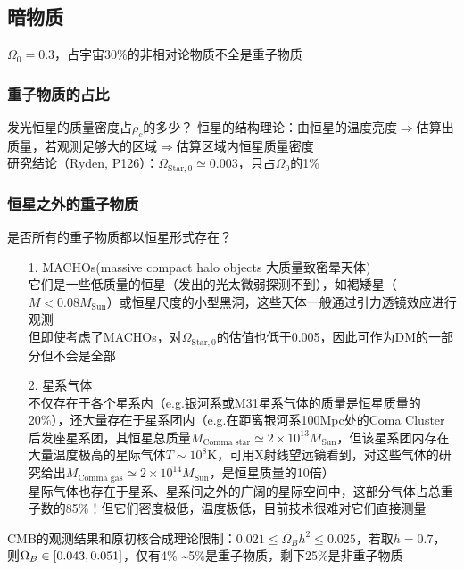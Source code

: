 \subsection{暗物质}
\par 
$\Omega_{0} = 0.3$，占宇宙30\%的非相对论物质不全是重子物质
\subsubsection{重子物质的占比}
\begin{cbox}
	{发光恒星的质量密度占$\rho_c$的多少？}
	恒星的结构理论：由恒星的温度亮度$\Rightarrow$估算出质量，若观测足够大的区域$\Rightarrow$估算区域内恒星质量密度 \\
	研究结论（Ryden, P126）：$\Omega_{\text{Star}, 0} \simeq 0.003$，只占$\Omega_{0}$的1\%
\end{cbox}


\subsubsection{恒星之外的重子物质}
\par
是否所有的重子物质都以恒星形式存在？
\begin{itemize}
	\item[1. ] MACHOs(massive compact halo objects 大质量致密晕天体) \\
	它们是一些低质量的恒星（发出的光太微弱探测不到），如褐矮星（$M < 0.08 M_{\text{Sun}}$）或恒星尺度的小型黑洞，这些天体一般通过引力透镜效应进行观测 \\
	但即使考虑了MACHOs，对$\Omega_{\text{Star}, 0}$的估值也低于0.005，因此可作为DM的一部分但不会是全部
	\item[2. ] 星系气体 \\
	不仅存在于各个星系内（e.g.银河系或M31星系气体的质量是恒星质量的20\%），还大量存在于星系团内（e.g.在距离银河系100Mpc处的Coma Cluster后发座星系团，其恒星总质量$M_{\text{Comma star}} \simeq 2 \times 10^{13} M_{\text{Sun}}$，但该星系团内存在大量温度极高的星际气体$T \sim 10^8 \mathrm{K}$，可用X射线望远镜看到，对这些气体的研究给出$M_{\text{Comma gas}} \simeq 2 \times 10^{14} M_{\text{Sun}}$，是恒星质量的10倍） \\
	星际气体也存在于星系、星系间之外的广阔的星际空间中，这部分气体占总重子数的85\%！但它们密度极低，温度极低，目前技术很难对它们直接测量
\end{itemize}

\par 
CMB的观测结果和原初核合成理论限制：$0.021 \leqslant \Omega_{B} h^2 \leqslant 0.025$，若取$h = 0.7$，则$\Omega_{B} \in \qty[0.043, 0.051]$，仅有4\% \textasciitilde 5\%是重子物质，剩下25\%是非重子物质

